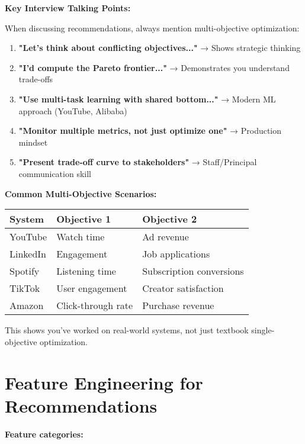 \documentclass[10pt]{article}
\begin{document}
\textbf{Key Interview Talking Points:}

When discussing recommendations, always mention multi-objective optimization:
\begin{enumerate}
\item \textbf{"Let's think about conflicting objectives..."} → Shows strategic thinking
\item \textbf{"I'd compute the Pareto frontier..."} → Demonstrates you understand trade-offs
\item \textbf{"Use multi-task learning with shared bottom..."} → Modern ML approach (YouTube, Alibaba)
\item \textbf{"Monitor multiple metrics, not just optimize one"} → Production mindset
\item \textbf{"Present trade-off curve to stakeholders"} → Staff/Principal communication skill
\end{enumerate}

\textbf{Common Multi-Objective Scenarios:}

\begin{tabular}{|l|l|l|}
\hline
\textbf{System} & \textbf{Objective 1} & \textbf{Objective 2} \\
\hline
YouTube & Watch time & Ad revenue \\
LinkedIn & Engagement & Job applications \\
Spotify & Listening time & Subscription conversions \\
TikTok & User engagement & Creator satisfaction \\
Amazon & Click-through rate & Purchase revenue \\
\hline
\end{tabular}

This shows you've worked on real-world systems, not just textbook single-objective optimization.

\section{Feature Engineering for Recommendations}

\textbf{Feature categories:}
\end{document}
